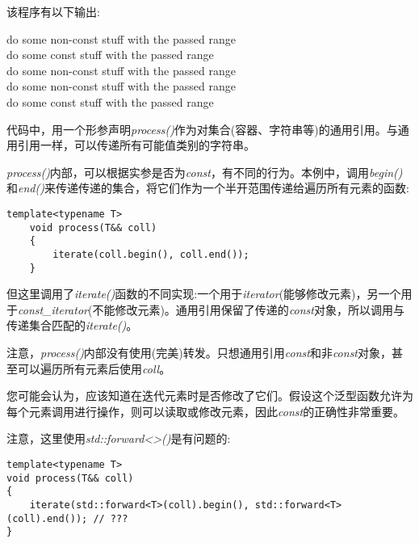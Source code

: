 该程序有以下输出:\par

\begin{tcolorbox}[colback=white,colframe=black]
do some non-const stuff with the passed range \\
do some const stuff with the passed range \\
do some non-const stuff with the passed range \\
do some non-const stuff with the passed range \\
do some const stuff with the passed range
\end{tcolorbox}

代码中，用一个形参声明\textit{process()}作为对集合(容器、字符串等)的通用引用。与通用引用一样，可以传递所有可能值类别的字符串。\par

\textit{process()}内部，可以根据实参是否为\textit{const}，有不同的行为。本例中，调用\textit{begin()}和\textit{end()}来传递传递的集合，将它们作为一个半开范围传递给遍历所有元素的函数:\par

\begin{lstlisting}[caption={}]
	template<typename T>
	void process(T&& coll)
	{
		iterate(coll.begin(), coll.end());
	}
\end{lstlisting}

但这里调用了\textit{iterate()}函数的不同实现:一个用于\textit{iterator}(能够修改元素)，另一个用于\textit{const\_iterator}(不能修改元素)。通用引用保留了传递的\textit{const}对象，所以调用与传递集合匹配的\textit{iterate()}。\par

注意，\textit{process()}内部没有使用(完美)转发。只想通用引用\textit{const}和非\textit{const}对象，甚至可以遍历所有元素后使用\textit{coll}。\par

您可能会认为，应该知道在迭代元素时是否修改了它们。假设这个泛型函数允许为每个元素调用进行操作，则可以读取或修改元素，因此\textit{const}的正确性非常重要。\par

注意，这里使用\textit{std::forward<>()}是有问题的:\par

\begin{lstlisting}[caption={}]
template<typename T>
void process(T&& coll)
{
	iterate(std::forward<T>(coll).begin(), std::forward<T>(coll).end()); // ???
}
\end{lstlisting}

